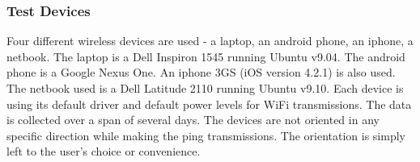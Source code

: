 \subsubsection{Test Devices}
\label{subsubsec:testdevices}

Four different wireless devices are used - a laptop, an android phone, an iphone, a netbook. The laptop is a Dell Inspiron 1545 running Ubuntu v9.04. The android phone is a Google Nexus One. An iphone 3GS (iOS version 4.2.1) is also used. The netbook used is a Dell Latitude 2110 running Ubuntu v9.10. Each device is using its default driver and default power levels for WiFi transmissions. %
The data is collected over a span of several days. The devices are not oriented
in any specific direction while making the ping transmissions. The orientation is simply left to the user's choice or convenience. 

%
